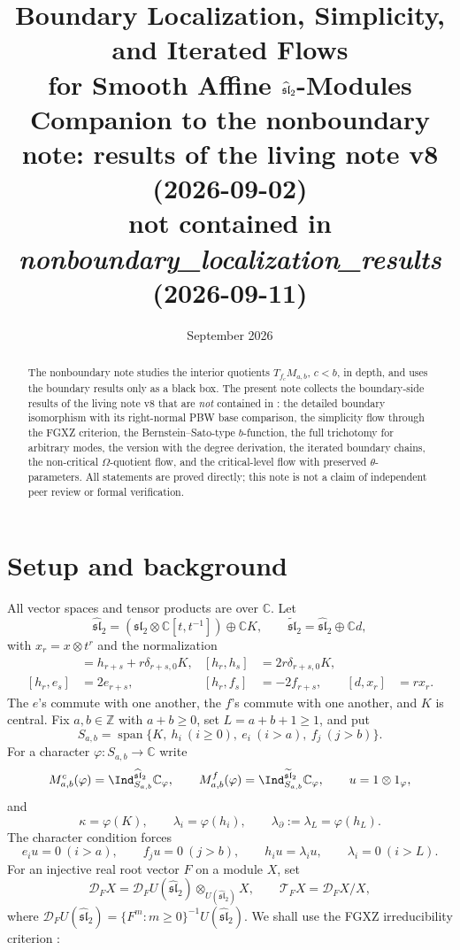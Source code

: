 \documentclass[11pt,a4paper]{article}
\title{\vspace{-14mm}Boundary Localization, Simplicity, and Iterated Flows\\
for Smooth Affine \(\slh\)-Modules\\[3pt]
\large Companion to the nonboundary note: results of the living note v8 (2026-09-02)\\
not contained in \emph{nonboundary\_localization\_results} (2026-09-11)}
\author{}
\date{September 2026}
\newcommand{\C}{\mathbb C}
\newcommand{\Z}{\mathbb Z}
\newcommand{\slc}{\mathfrak{sl}_2}
\newcommand{\slh}{\widehat{\mathfrak{sl}}_2}
\newcommand{\slt}{\widetilde{\mathfrak{sl}}_2}
\newcommand{\Span}{\operatorname{span}}
\newcommand{\D}{\mathcal D}
\newcommand{\T}{\mathcal T}
\theoremstyle{plainupright}
\begin{document}
\maketitle
\vspace{-9mm}
\begin{abstract}
The nonboundary note \cite{Nonboundary} studies the interior quotients
\(T_{f_c}M_{a,b}\), \(c<b\), in depth, and uses the boundary results only as a
black box. The present note collects the boundary-side results of the living
note v8 \cite{LivingV8} that are \emph{not} contained in \cite{Nonboundary}:
the detailed boundary isomorphism with its right-normal PBW base comparison,
the simplicity flow through the FGXZ criterion, the Bernstein--Sato-type
\(b\)-function, the full trichotomy for arbitrary modes, the version with the
degree derivation, the iterated boundary chains, the non-critical
\(\Omega\)-quotient flow, and the critical-level flow with preserved
\(\theta\)-parameters. All statements are proved directly; this note is not a
claim of independent peer review or formal verification.
\end{abstract}

\section{Setup and background}\label{sec:setup}

All vector spaces and tensor products are over \(\C\). Let
\[
\slh=(\slc\otimes\C[t,t^{-1}])\oplus\C K,\qquad \slt=\slh\oplus\C d,
\]
with \(x_r=x\otimes t^r\) and the normalization
\begin{align*}
[e_r,f_s]&=h_{r+s}+r\delta_{r+s,0}K,&
[h_r,h_s]&=2r\delta_{r+s,0}K,\\
[h_r,e_s]&=2e_{r+s},&
[h_r,f_s]&=-2f_{r+s},&
[d,x_r]&=rx_r.
\end{align*}
The \(e\)'s commute with one another, the \(f\)'s commute with one another,
and \(K\) is central. Fix \(a,b\in\Z\) with \(a+b\ge0\), set \(L=a+b+1\ge1\),
and put
\[
S_{a,b}=\Span\{K,\ h_i\ (i\ge0),\ e_i\ (i>a),\ f_j\ (j>b)\}.
\]
For a character \(\varphi:S_{a,b}\to\C\) write
\[
M^c_{a,b}(\varphi)=\Ind_{S_{a,b}}^{\slh}\C_\varphi,
\qquad
M^f_{a,b}(\varphi)=\Ind_{S_{a,b}}^{\slt}\C_\varphi,
\qquad u=1\otimes1_\varphi,
\]
and
\[
\kappa=\varphi(K),\qquad \lambda_i=\varphi(h_i),
\qquad \lambda_\partial:=\lambda_L=\varphi(h_L).
\]
The character condition forces
\[
e_iu=0\ (i>a),\qquad f_ju=0\ (j>b),\qquad
h_iu=\lambda_iu,\qquad \lambda_i=0\ (i>L).
\]
For an injective real root vector \(F\) on a module \(X\), set
\[
\D_FX=\D_FU(\slh)\otimes_{U(\slh)}X,\qquad
\T_FX=\D_FX/X,
\]
where \(\D_FU(\slh)=\{F^m:m\ge0\}^{-1}U(\slh)\). We shall use the FGXZ
irreducibility criterion \cite{FGXZ}:
\end{document}

